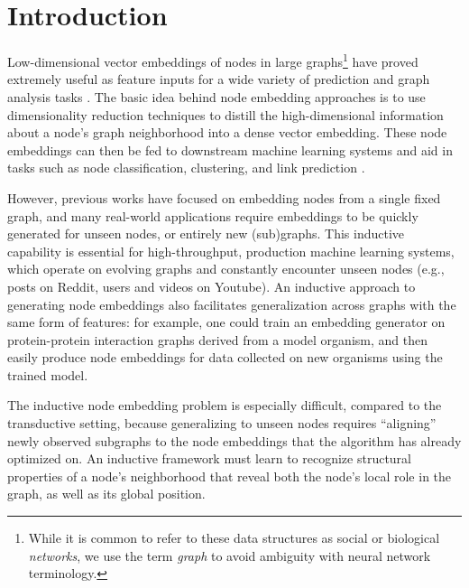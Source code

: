 
\section{Introduction}
\label{sec:intro}

Low-dimensional  vector embeddings of nodes in large graphs\footnote{While it is common to refer to these data structures as social or biological \emph{networks}, we use the term \emph{graph} to avoid ambiguity with neural network terminology.} have proved extremely useful as feature inputs for a wide variety of prediction and graph analysis tasks \cite{cao2015grarep,grover2016node2vec,perozzi2014deepwalk,tang2015line,wang2016structural}.
The basic idea behind node embedding approaches is to use dimensionality reduction techniques to distill the high-dimensional information about a node's graph neighborhood into a dense vector embedding. 
These node embeddings can then be fed to downstream machine learning systems and aid in tasks such as node classification, clustering, and link prediction \cite{grover2016node2vec,perozzi2014deepwalk,tang2015line}.

However, previous works have focused on embedding nodes from a single fixed graph, and many real-world applications require embeddings to be quickly generated for unseen nodes, or entirely new (sub)graphs. 
This inductive capability is essential for high-throughput, production machine learning systems, which operate on evolving graphs and constantly encounter unseen nodes (e.g., posts on Reddit, users and videos on Youtube).
An inductive approach to generating node embeddings also facilitates generalization across graphs with the same form of features:
for example, one could train an embedding generator on protein-protein interaction graphs derived from a model organism, and then easily produce node embeddings for data collected on new organisms using the trained model. 

The inductive node embedding problem is especially difficult, compared to the transductive setting, because generalizing to unseen nodes  requires ``aligning'' newly observed subgraphs to the node embeddings that the algorithm has already optimized on. 
An inductive framework must learn to recognize structural properties of a node's neighborhood that reveal both the node's local role in the graph, as well as its global position. 
 
